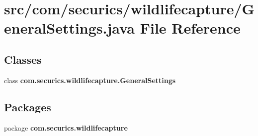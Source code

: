 \section{src/com/securics/wildlifecapture/\+General\+Settings.java File Reference}
\label{_general_settings_8java}
\subsection*{Classes}
\begin{DoxyCompactItemize}
\item 
class {\bf com.\+securics.\+wildlifecapture.\+General\+Settings}
\end{DoxyCompactItemize}
\subsection*{Packages}
\begin{DoxyCompactItemize}
\item 
package {\bf com.\+securics.\+wildlifecapture}
\end{DoxyCompactItemize}

